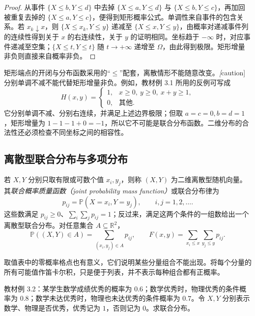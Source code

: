 \begin{proof}
从事件 $\{X\le b,Y\le d\}$ 中去掉 $\{X\le a,Y\le d\}$ 与 $\{X\le b,Y\le c\}$，再加回被重复去掉的 $\{X\le a,Y\le c\}$，便得到矩形概率公式。单调性来自事件的包含关系。若 $x_k\downarrow x$，则 $\{X\le x_k,Y\le y\}$ 递减至 $\{X\le x,Y\le y\}$，由概率对递减事件列的连续性得到关于 $x$ 的右连续性，关于 $y$ 的证明相同。坐标趋于 $-\infty$ 时，对应事件递减至空集；$\{X\le t,Y\le t\}$ 随 $t\to+\infty$ 递增至 $\Omega$，由此得到极限。矩形增量非负则直接来自概率非负。
\end{proof}

矩形端点的开闭与分布函数采用的“$\le$”配套，离散情形不能随意改变。\emph[caution]{分别单调不减不能代替矩形增量非负。}例如，教材例 3.1 所用的反例可写成
\[
  H(x,y)=
  \begin{cases}
    1,&x\ge0,\ y\ge0,\ x+y\ge1,\\
    0,&\text{其他}.
  \end{cases}
\]
它分别单调不减、分别右连续，并满足上述边界极限；但取 $a=c=0,b=d=1$，矩形增量为 $1-1-1+0=-1$，所以它不可能是联合分布函数。二维分布的合法性还必须检查不同坐标之间的相容性。

\subsection{离散型联合分布与多项分布}

\begin{definition}
\label{def:study-ch3-joint-pmf}
若 $X,Y$ 分别只取有限或可数个值 $x_i,y_j$，则称 $(X,Y)$ 为二维离散型随机向量。其\emph{联合概率质量函数（joint probability mass function）}或联合分布律为
\[
  p_{ij}=\mathbb P(X=x_i,Y=y_j),\qquad i,j=1,2,\ldots.
\]
这些数满足 $p_{ij}\ge0$、$\sum_i\sum_jp_{ij}=1$；反过来，满足这两个条件的一组数给出一个离散型联合分布。对任意集合 $A\subseteq\mathbb R^2$，
\begin{equation}
  \mathbb P((X,Y)\in A)=\sum_{(x_i,y_j)\in A}p_{ij},\qquad
  F(x,y)=\sum_{x_i\le x}\sum_{y_j\le y}p_{ij}.
  \label{eq:study-ch3-joint-pmf-probability}
\end{equation}
\end{definition}

取值表中的零概率格点也有意义，它们说明某些分量组合不能出现。将每个分量的所有可能值作笛卡尔积，只是便于列表，并不表示每种组合都有正概率。

\begin{example}
\label{ex:study-ch3-joint-exam}
教材例 3.2：某学生数学成绩优秀的概率为 $0.6$；数学优秀时，物理优秀的条件概率为 $0.8$；数学未达优秀时，物理也未达优秀的条件概率为 $0.7$。令 $X,Y$ 分别表示数学、物理是否优秀，优秀记为 $1$，否则记为 $0$。求联合分布。
\end{example}


